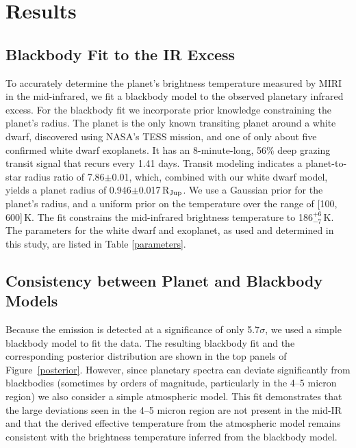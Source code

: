 \documentclass[twocolumn]{aastex631}
\begin{document}
\section{Results} \label{sec:results}

\subsection{Blackbody Fit to the IR Excess}

To accurately determine the planet’s brightness temperature measured by MIRI in the mid-infrared, we fit a blackbody model to the observed planetary infrared excess. For the blackbody fit we incorporate prior knowledge constraining the planet's radius. The planet is the only known transiting planet around a white dwarf, discovered using NASA's TESS mission, and one of only about five confirmed white dwarf exoplanets\citep{veras2021planetary}. It has an 8-minute-long, 56\% deep grazing transit signal that recurs every 1.41 days\citep{2023MNRAS.521.4679K}. Transit modeling indicates a planet-to-star radius ratio of 7.86$\pm$0.01\citep{2021AJ....162..296X}, which, combined with our white dwarf model, yields a planet radius of 0.946$\pm$0.017\,R$_{\rm Jup}$. We use a Gaussian prior for the planet’s radius, and a uniform prior on the temperature over the range of [100, 600]\,K.  The fit constrains the mid-infrared brightness temperature to 186$^{+6}_{-7}$\,K. The parameters for the white dwarf and exoplanet, as used and determined in this study, are listed in Table \ref{parameters}.





\subsection{Consistency between Planet and Blackbody Models}

Because the emission is detected at a significance of only 5.7$\sigma$, we used a simple blackbody model to fit the data. The resulting blackbody fit and the corresponding posterior distribution are shown in the top panels of Figure~\ref{posterior}. However, since planetary spectra can deviate significantly from blackbodies { (sometimes by orders of magnitude, particularly in the 4–5 micron region) we also consider a simple atmospheric model. This fit demonstrates that the large deviations seen in the 4–5 micron region are not present in the mid-IR and that the derived effective temperature from the atmospheric model remains consistent with the brightness temperature inferred from the blackbody model.}
\end{document}
